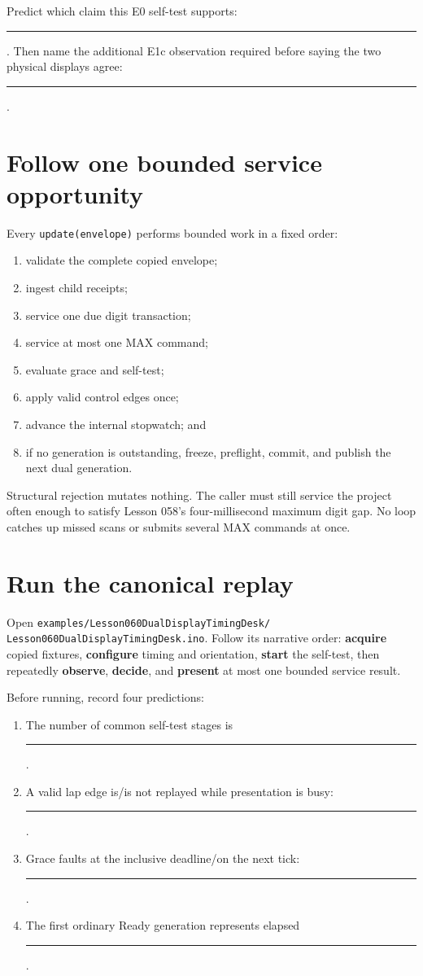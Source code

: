 \documentclass[10pt]{article}
\newcommand{\blankline}{\rule{0.76in}{0.4pt}}
\newcommand{\longblank}{\rule{1.28in}{0.4pt}}
\begin{document}
Predict which claim this E0 self-test supports: \longblank. Then name the
additional E1c observation required before saying the two physical displays
agree: \longblank.

\section{Follow one bounded service opportunity}
Every \texttt{update(envelope)} performs bounded work in a fixed order:
\begin{enumerate}
 \item validate the complete copied envelope;
 \item ingest child receipts;
 \item service one due digit transaction;
 \item service at most one MAX command;
 \item evaluate grace and self-test;
 \item apply valid control edges once;
 \item advance the internal stopwatch; and
 \item if no generation is outstanding, freeze, preflight, commit, and publish
       the next dual generation.
\end{enumerate}

Structural rejection mutates nothing. The caller must still service the
project often enough to satisfy Lesson 058's four-millisecond maximum digit
gap. No loop catches up missed scans or submits several MAX commands at once.

\section{Run the canonical replay}
Open
\texttt{examples/Lesson060DualDisplayTimingDesk/}\\
\texttt{Lesson060DualDisplayTimingDesk.ino}. Follow its narrative order:
\textbf{acquire} copied fixtures, \textbf{configure} timing and orientation,
\textbf{start} the self-test, then repeatedly \textbf{observe}, \textbf{decide},
and \textbf{present} at most one bounded service result.

Before running, record four predictions:
\begin{enumerate}
 \item The number of common self-test stages is \blankline.
 \item A valid lap edge is/is not replayed while presentation is busy:
       \blankline.
 \item Grace faults at the inclusive deadline/on the next tick:
       \blankline.
 \item The first ordinary Ready generation represents elapsed
       \blankline.
\end{enumerate}
\end{document}

